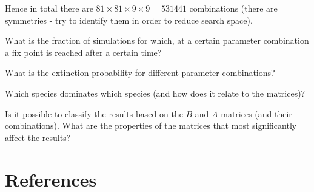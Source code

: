 \documentclass[
12.5pt, 					%
a4paper, 				%
oneside,					%
headinclude,footinclude, %
BCOR5mm, 				%
abstract=on
]{scrreprt}
\let\oldbibliography
\renewcommand{}[1]{
{
  \let\chapter\section%
  \oldbibliography{#1}}
}
\numberwithin{equation}{chapter}
\begin{document}
Hence in total there are $81 \times 81 \times 9 \times 9 = 531441$ combinations (there are symmetries - try to identify them in order to reduce search space).
\newline


What is the fraction of simulations for which, at a certain parameter combination a fix point is reached after a certain time?
\newline

What is the extinction probability for different parameter combinations?
\newline

Which species dominates which species (and how does it relate to the matrices)?
\newline

Is it possible to classify the results based on the $B$ and $A$ matrices (and their combinations).
What are the properties of the matrices that most significantly affect the results?
\newline



\renewcommand{\bibname}{}
\vspace{2cm}
\section*{References}

\end{document}
